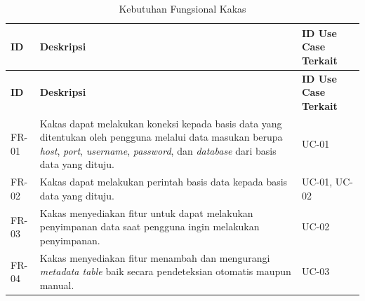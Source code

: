 \begin{small}
	\begin{longtable}{ | p{2cm} | p{6cm} | p{4cm} | }
		\caption{Kebutuhan Fungsional Kakas}
		\label{KebutuhanFungsional}                                                                                                                                                                                                                                                                                                  \\ \hline
		\centering\bfseries{ID} & \centering\bfseries{Deskripsi}                                                                                                                                                                                                   & \centering\bfseries{ID Use Case Terkait} \tabularnewline \hline
		\endfirsthead
		\hline
		\centering\bfseries{ID} & \centering\bfseries{Deskripsi}                                                                                                                                                                                                   & \centering\bfseries{ID Use Case Terkait} \tabularnewline \hline
		\endhead
		FR-01                   & Kakas dapat melakukan koneksi kepada basis data yang ditentukan oleh pengguna melalui data masukan berupa \textit{host}, \textit{port}, \textit{username}, \textit{password}, dan \textit{database} dari basis data yang dituju. & UC-01                                                           \\ \hline
		FR-02                   & Kakas dapat melakukan perintah basis data kepada basis data yang dituju.                                                                                                                                                         & UC-01, UC-02                                                    \\ \hline
		FR-03                   & Kakas menyediakan fitur untuk dapat melakukan penyimpanan data saat pengguna ingin melakukan penyimpanan.                                                                                                                        & UC-02                                                           \\ \hline
		FR-04                   & Kakas menyediakan fitur menambah dan mengurangi \textit{metadata table} baik secara pendeteksian otomatis maupun manual.                                                                                                         & UC-03                                                           \\ \hline

\end{longtable}
\end{small}
